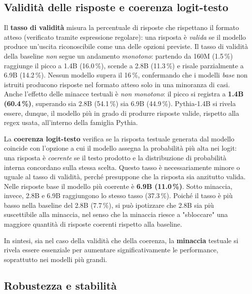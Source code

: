 \documentclass[../relazione.tex]{subfiles}
\begin{document}
\subsection{Validità delle risposte e coerenza logit-testo}

Il \textbf{tasso di validità} misura la percentuale di risposte che rispettano il formato atteso (verificato tramite espressione regolare): una risposta è \emph{valida} se il modello produce un'uscita riconoscibile come una delle opzioni previste. Il tasso di validità della baseline \emph{non} segue un andamento \emph{monotono}: partendo da 160M (1.5\,\%) raggiunge il picco a 1.4B (16.0\,\%), scende a 2.8B (11.3\,\%) e risale parzialmente a 6.9B (14.2\,\%). Nessun modello supera il 16\,\%, confermando che i modelli \emph{base} non istruiti producono risposte nel formato atteso solo in una minoranza di casi. Anche l'effetto delle minacce testuali è \emph{non monotono}: il picco si registra a \textbf{1.4B (60.4\,\%)}, superando sia 2.8B (54.1\,\%) sia 6.9B (44.9\,\%). Pythia-1.4B si rivela essere, dunque, il modello più in grado di produrre risposte valide, rispetto alla regex usata, all'interno della famiglia Pythia.

La \textbf{coerenza logit-testo} verifica se la risposta testuale generata dal modello coincide con l'opzione a cui il modello assegna la probabilità più alta nei logit: una risposta è \emph{coerente} se il testo prodotto e la distribuzione di probabilità interna concordano sulla stessa scelta. Questo tasso è necessariamente minore o uguale al tasso di validità, perché presuppone che la risposta sia anzitutto valida. Nelle risposte base il modello più coerente è \textbf{6.9B (11.0\,\%)}. Sotto minaccia, invece, 2.8B e 6.9B raggiungono lo stesso tasso (37.3\,\%). Poiché il tasso è più basso nella baseline del 2.8B (7.7\,\%), si può ipotizzare che 2.8B sia più suscettibile alla minaccia, nel senso che la minaccia riesce a "sbloccare" una maggiore quantità di risposte coerenti rispetto alla baseline.

In sintesi, sia nel caso della validità che della coerenza, la \textbf{minaccia} testuale si rivela essere essenziale per aumentare significativamente le performance, soprattutto nei modelli più grandi. 

\subsection{Robustezza e stabilità}
\end{document}

